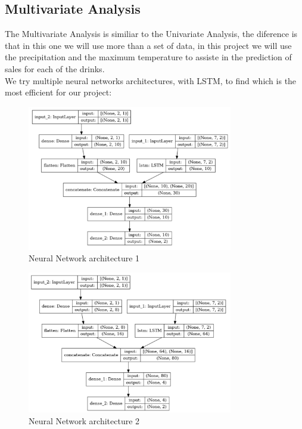 \newpage
\subsection{Multivariate Analysis}

\quad The Multivariate Analysis is similiar to the Univariate Analysis, the diference is that in this one we will use more than a set of data, in this project we will use the precipitation and the maximum temperature to assiste in the prediction of sales for each of the drinks.\\


We try multiple neural networks architectures, with LSTM, to find which is the most efficient for our project:

\begin{figure}[H]
    \centering
    \includegraphics[width=0.8\textwidth]{assets/mult4.png}
    \caption{Neural Network architecture 1}
    \label{fig:neural_network}
    \end{figure}

    \begin{figure}[H]
        \centering
        \includegraphics[width=0.8\textwidth]{assets/mult5.png}
        \caption{Neural Network architecture 2}
        \label{fig:neural_network}
        \end{figure}

